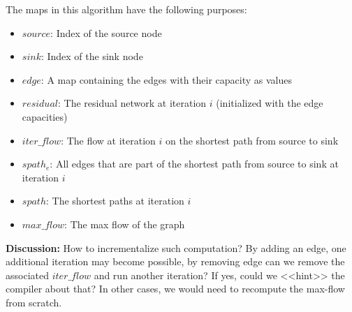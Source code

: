 \documentclass[11pt]{article}
\newlength{\dlen}
\def\discuss#1{\par\hspace{2em}
\setlength{\dlen}{\textwidth}
\addtolength{\dlen}{-2em}
\begin{minipage}{\dlen}\footnotesize {\bf\color{red} Discussion:} #1\end{minipage}\par}
\begin{document}
The maps in this algorithm have the following purposes:
\begin{itemize}
\item $source$: Index of the source node
\item $sink$: Index of the sink node
\item $edge$: A map containing the edges with their capacity as values
\item $residual$: The residual network at iteration $i$ (initialized with the edge capacities)
\item $iter\_flow$: The flow at iteration $i$ on the shortest path from source to sink
\item $spath_e$: All edges that are part of the shortest path from source to sink at iteration $i$
\item $spath$: The shortest paths at iteration $i$
\item $max\_flow$: The max flow of the graph 
\end{itemize}
\discuss{
How to incrementalize such computation? By adding an edge, one additional iteration may become possible, by removing edge can we remove the associated $iter\_flow$ and run another iteration? If yes, could we <<hint>> the compiler about that? In other cases, we would need to recompute the max-flow from scratch.
}

\end{document}
